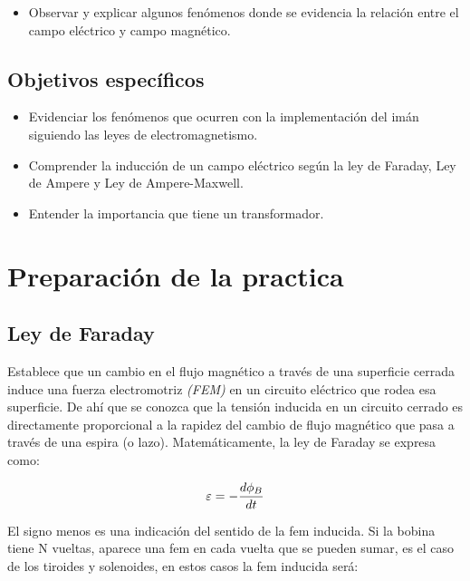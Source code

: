 \documentclass[twocolumn, 12pt]{article}
\begin{document}
\begin{itemize}[label=$\triangleright$]
	\item Observar y explicar algunos fenómenos donde se evidencia la
	      relación entre el campo eléctrico y campo magnético.
\end{itemize}

\subsection*{Objetivos específicos}

\begin{itemize}[label=$\triangleright$]
	\item Evidenciar los fenómenos que ocurren con la implementación
	      del imán siguiendo las leyes de electromagnetismo.
	\item Comprender la inducción de un campo eléctrico según la ley
	      de Faraday, Ley de Ampere y Ley de Ampere-Maxwell.
	\item Entender la importancia que tiene un transformador.
\end{itemize}

\section{Preparación de la practica}

\subsection*{Ley de Faraday}

Establece que un cambio en el flujo magnético a través de
una superficie cerrada induce una fuerza electromotriz
\textit{(FEM)} en un circuito eléctrico que rodea esa
superficie. De ahí que se conozca que la tensión inducida
en un circuito cerrado es directamente proporcional a la
rapidez del cambio de flujo magnético que pasa a través de
una espira (o lazo). Matemáticamente, la ley de Faraday se
expresa como:

{\Large
\begin{equation}
	\varepsilon = - \frac{d\phi_B}{dt} \centering
\end{equation}
}

El signo menos es una indicación del sentido de la fem
inducida. Si la bobina tiene N vueltas, aparece una fem en
cada vuelta que se pueden sumar, es el caso de los tiroides
y solenoides, en estos casos la fem inducida será:
\end{document}
